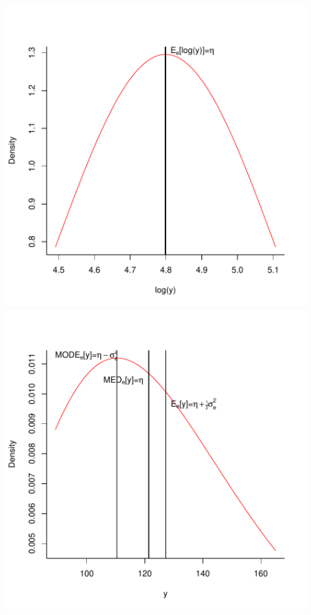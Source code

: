 \documentclass{article}
\begin{document}
\begin{figure}
\begin{minipage}[b]{0.5\linewidth} %
\centering
\includegraphics{Lecture2-037}
\end{minipage}
\hspace{0.5cm} %
\begin{minipage}[b]{0.5\linewidth}
\centering
\includegraphics{Lecture2-038}

\end{minipage}
\end{figure}
\end{document}
